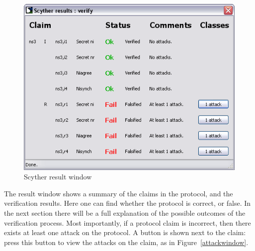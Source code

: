 \documentclass{book}
\begin{document}
\begin{figure}[!htb]
  \begin{center}
    \includegraphics[scale=0.5]{resultwindow}
  \end{center}
  \label{resultwindow}
  \caption{Scyther result window}
\end{figure}

The result window shows a summary of the claims in the protocol, and the
verification results. Here one can find whether the protocol is correct,
or false. In the next section there will be a full explanation of the
possible outcomes of the verification process. Most importantly, if a
protocol claim is incorrect, then there exists at least one
attack on the protocol. A button is shown next to the claim: press this
button to view the attacks on the claim, as in
Figure~\ref{attackwindow}.
\end{document}
